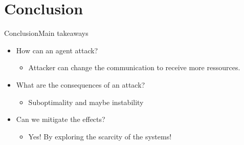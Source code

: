 \documentclass[aspectratio=169]{beamer}
\begin{document}
\section{Conclusion}

\begin{frame}{Conclusion}{Main takeaways}
  \begin{itemize}
    \item How can an agent attack? 
  \begin{itemize}
    \item<2-> Attacker can change the communication to receive more ressources.
  \end{itemize}
    \item What are the consequences of an attack? 
  \begin{itemize}
    \item<3-> Suboptimality and maybe instability
  \end{itemize}
    \item Can we mitigate the effects? 
  \begin{itemize}
          \item<4-> Yes! By exploring the scarcity of the systems!
  \end{itemize}
  \end{itemize}
\end{frame}
\end{document}
